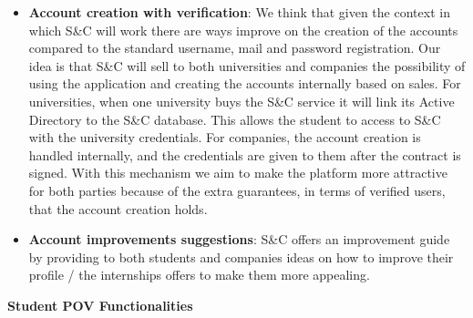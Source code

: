 \begin{itemize}
      \item \textbf{Account creation with verification}:
            We think that given the context in which S\&C will work there are ways improve on the creation of the
            accounts compared to the standard username, mail and password registration. Our idea is that S\&C will sell
            to both universities and companies the possibility of using the application and creating the accounts
            internally based on sales. For universities, when one university buys the S\&C service it will link its
            Active Directory to the S\&C database. This allows the student to access to S\&C with the university
            credentials. For companies, the account creation is handled internally, and the credentials are given to
            them after the contract is signed. With this mechanism we aim to make the platform more attractive for both
            parties because of the extra guarantees, in terms of verified users, that the account creation holds.
      \item \textbf{Account improvements suggestions}:
            S\&C offers an improvement guide by providing to both students and companies ideas on how to improve their
            profile / the internships offers to make them more appealing.
\end{itemize}

\par\textbf{Student POV Functionalities}

